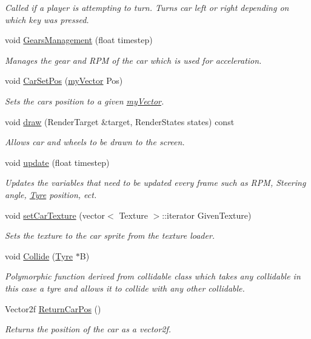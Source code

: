 \begin{DoxyCompactItemize}
\begin{DoxyCompactList}\small\item\em Called if a player is attempting to turn. Turns car left or right depending on which key was pressed. \end{DoxyCompactList}\item 
void \hyperlink{class_car_a17070db3aab0bd07fc7aa33014577c44}{Gears\+Management} (float timestep)
\begin{DoxyCompactList}\small\item\em Manages the gear and R\+P\+M of the car which is used for acceleration. \end{DoxyCompactList}\item 
void \hyperlink{class_car_a00b4b7e97883fe68f6b6ce0cb314ac1d}{Car\+Set\+Pos} (\hyperlink{classmy_vector}{my\+Vector} Pos)
\begin{DoxyCompactList}\small\item\em Sets the car\textquotesingle{}s position to a given \hyperlink{classmy_vector}{my\+Vector}. \end{DoxyCompactList}\item 
void \hyperlink{class_car_a61fa68cf77c965400f16546a75278466}{draw} (Render\+Target \&target, Render\+States states) const 
\begin{DoxyCompactList}\small\item\em Allows car and wheels to be drawn to the screen. \end{DoxyCompactList}\item 
void \hyperlink{class_car_afe9470e7880c07e082633d900328b312}{update} (float timestep)
\begin{DoxyCompactList}\small\item\em Updates the variables that need to be updated every frame such as R\+P\+M, Steering angle, \hyperlink{class_tyre}{Tyre} position, ect. \end{DoxyCompactList}\item 
void \hyperlink{class_car_a6a4377866be6ad14841bb70f87a68327}{set\+Car\+Texture} (vector$<$ Texture $>$\+::iterator Given\+Texture)
\begin{DoxyCompactList}\small\item\em Sets the texture to the car sprite from the texture loader. \end{DoxyCompactList}\item 
void \hyperlink{class_car_abf01c052dd364f40cfbc2881b79b5ea4}{Collide} (\hyperlink{class_tyre}{Tyre} $\ast$B)
\begin{DoxyCompactList}\small\item\em Polymorphic function derived from collidable class which takes any collidable in this case a tyre and allows it to collide with any other collidable. \end{DoxyCompactList}\item 
Vector2f \hyperlink{class_car_aa54320ce418c1f377eb595853dd1939c}{Return\+Car\+Pos} ()
\begin{DoxyCompactList}\small\item\em Returns the position of the car as a vector2f. \end{DoxyCompactList}\end{DoxyCompactItemize}
